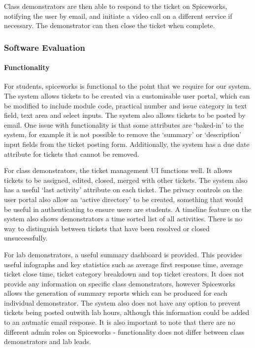 \documentclass[a4paper,11pt]{article}
\begin{document}
Class demonstrators are then able to respond to the ticket on Spiceworks, notifying the user by email, and initiate a video call on a different service if necessary. The demonstrator can then close the ticket when complete.

\subsubsection{Software Evaluation}

\paragraph{Functionality}
For students, spiceworks is functional to the point that we require for our system. The system allows tickets to be created via a customisable user portal, which can be modified to include module code, practical number and issue category in text field, text area and select inputs. The system also allows tickets to be posted by email. One issue with functionality is that some attributes are `baked-in' to the system, for example it is not possible to remove the `summary' or `description' input fields from the ticket posting form. Additionally, the system has a due date attribute for tickets that cannot be removed.

For class demonstrators, the ticket management UI functions well. It allows tickets to be assigned, edited, closed, merged with other tickets. The system also has a useful `last activity' attribute on each ticket. The privacy controls on the user portal also allow an `active directory' to be created, something that would be useful in authenticating to ensure users are students. A timeline feature on the system also shows demonstrators a time sorted list of all activities. There is no way to distinguish between tickets that have been resolved or closed unsuccessfully. 

For lab demonstrators, a useful summary dashboard is provided. This provides useful infographs and key statistics such as average first response time, average ticket close time, ticket category breakdown and top ticket creators. It does not provide any information on specific class demonstrators, however Spiceworks allows the generation of summary reports which can be produced for each individual demonstrator. The system also does not have any option to prevent tickets being posted outwith lab hours, although this information could be added to an autmatic email response. It is also important to note that there are no different admin roles on Spiceworks - functionality does not differ between class demonstrators and lab leads.
\end{document}
